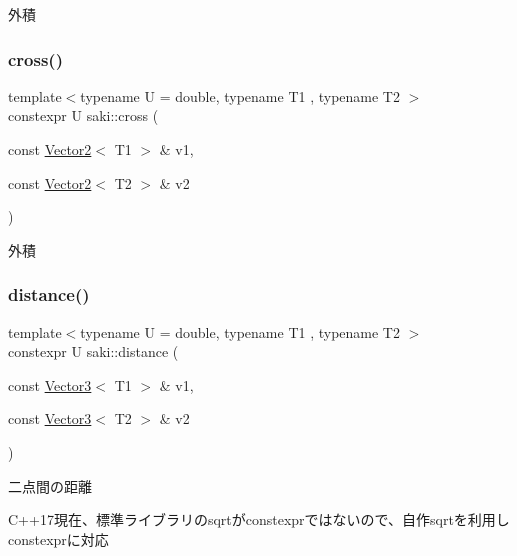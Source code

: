 外積 

\mbox{\label{namespacesaki_ab3e7c6abdd4377486e393407283a492b}} 
\subsubsection{\texorpdfstring{cross()}{cross()}\hspace{0.1cm}{\footnotesize\ttfamily [2/2]}}
{\footnotesize\ttfamily template$<$typename U  = double, typename T1 , typename T2 $>$ \\
constexpr U saki\+::cross (\begin{DoxyParamCaption}\item[{const \mbox{\hyperlink{classsaki_1_1_vector2}{Vector2}}$<$ T1 $>$ \&}]{v1,  }\item[{const \mbox{\hyperlink{classsaki_1_1_vector2}{Vector2}}$<$ T2 $>$ \&}]{v2 }\end{DoxyParamCaption})}



外積 

\mbox{\label{namespacesaki_a3323489be4b8c440241c8c8dcd517210}} 
\subsubsection{\texorpdfstring{distance()}{distance()}\hspace{0.1cm}{\footnotesize\ttfamily [1/2]}}
{\footnotesize\ttfamily template$<$typename U  = double, typename T1 , typename T2 $>$ \\
constexpr U saki\+::distance (\begin{DoxyParamCaption}\item[{const \mbox{\hyperlink{classsaki_1_1_vector3}{Vector3}}$<$ T1 $>$ \&}]{v1,  }\item[{const \mbox{\hyperlink{classsaki_1_1_vector3}{Vector3}}$<$ T2 $>$ \&}]{v2 }\end{DoxyParamCaption})}



二点間の距離 

C++17現在、標準ライブラリのsqrtがconstexprではないので、自作sqrtを利用しconstexprに対応 \mbox{\label{namespacesaki_a37a9f74395755bc30cad0d612369e322}} 

